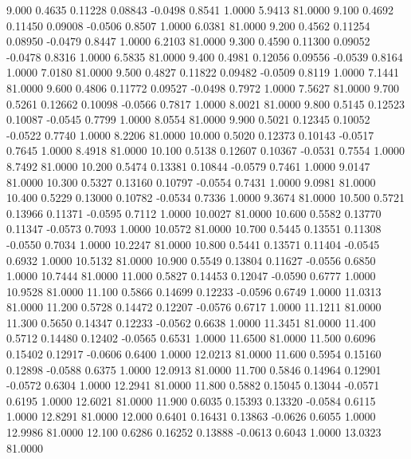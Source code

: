    9.000   0.4635   0.11228   0.08843  -0.0498   0.8541   1.0000   5.9413  81.0000
   9.100   0.4692   0.11450   0.09008  -0.0506   0.8507   1.0000   6.0381  81.0000
   9.200   0.4562   0.11254   0.08950  -0.0479   0.8447   1.0000   6.2103  81.0000
   9.300   0.4590   0.11300   0.09052  -0.0478   0.8316   1.0000   6.5835  81.0000
   9.400   0.4981   0.12056   0.09556  -0.0539   0.8164   1.0000   7.0180  81.0000
   9.500   0.4827   0.11822   0.09482  -0.0509   0.8119   1.0000   7.1441  81.0000
   9.600   0.4806   0.11772   0.09527  -0.0498   0.7972   1.0000   7.5627  81.0000
   9.700   0.5261   0.12662   0.10098  -0.0566   0.7817   1.0000   8.0021  81.0000
   9.800   0.5145   0.12523   0.10087  -0.0545   0.7799   1.0000   8.0554  81.0000
   9.900   0.5021   0.12345   0.10052  -0.0522   0.7740   1.0000   8.2206  81.0000
  10.000   0.5020   0.12373   0.10143  -0.0517   0.7645   1.0000   8.4918  81.0000
  10.100   0.5138   0.12607   0.10367  -0.0531   0.7554   1.0000   8.7492  81.0000
  10.200   0.5474   0.13381   0.10844  -0.0579   0.7461   1.0000   9.0147  81.0000
  10.300   0.5327   0.13160   0.10797  -0.0554   0.7431   1.0000   9.0981  81.0000
  10.400   0.5229   0.13000   0.10782  -0.0534   0.7336   1.0000   9.3674  81.0000
  10.500   0.5721   0.13966   0.11371  -0.0595   0.7112   1.0000  10.0027  81.0000
  10.600   0.5582   0.13770   0.11347  -0.0573   0.7093   1.0000  10.0572  81.0000
  10.700   0.5445   0.13551   0.11308  -0.0550   0.7034   1.0000  10.2247  81.0000
  10.800   0.5441   0.13571   0.11404  -0.0545   0.6932   1.0000  10.5132  81.0000
  10.900   0.5549   0.13804   0.11627  -0.0556   0.6850   1.0000  10.7444  81.0000
  11.000   0.5827   0.14453   0.12047  -0.0590   0.6777   1.0000  10.9528  81.0000
  11.100   0.5866   0.14699   0.12233  -0.0596   0.6749   1.0000  11.0313  81.0000
  11.200   0.5728   0.14472   0.12207  -0.0576   0.6717   1.0000  11.1211  81.0000
  11.300   0.5650   0.14347   0.12233  -0.0562   0.6638   1.0000  11.3451  81.0000
  11.400   0.5712   0.14480   0.12402  -0.0565   0.6531   1.0000  11.6500  81.0000
  11.500   0.6096   0.15402   0.12917  -0.0606   0.6400   1.0000  12.0213  81.0000
  11.600   0.5954   0.15160   0.12898  -0.0588   0.6375   1.0000  12.0913  81.0000
  11.700   0.5846   0.14964   0.12901  -0.0572   0.6304   1.0000  12.2941  81.0000
  11.800   0.5882   0.15045   0.13044  -0.0571   0.6195   1.0000  12.6021  81.0000
  11.900   0.6035   0.15393   0.13320  -0.0584   0.6115   1.0000  12.8291  81.0000
  12.000   0.6401   0.16431   0.13863  -0.0626   0.6055   1.0000  12.9986  81.0000
  12.100   0.6286   0.16252   0.13888  -0.0613   0.6043   1.0000  13.0323  81.0000
